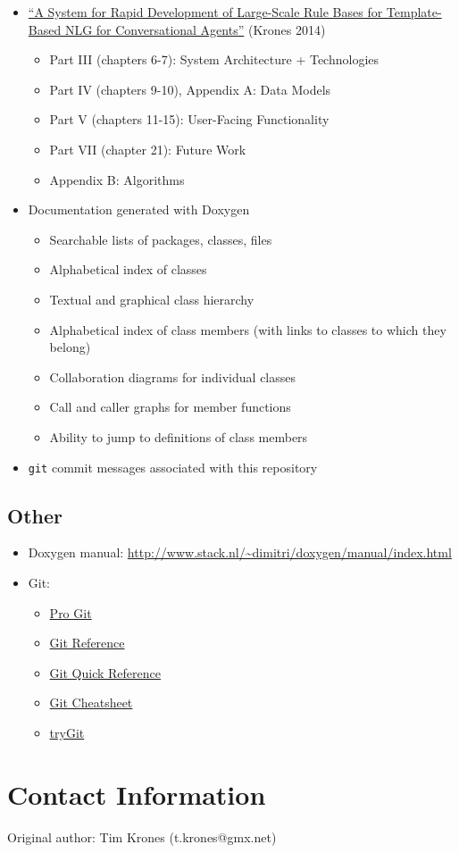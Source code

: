 \documentclass[11pt]{article}
\begin{document}
\begin{itemize}
\item \href{thesis-krones.pdf}{``A System for Rapid Development of Large-Scale Rule Bases for Template-Based NLG for Conversational Agents''} (Krones 2014)
\begin{itemize}
\item Part III (chapters 6-7): System Architecture + Technologies
\item Part IV (chapters 9-10), Appendix A: Data Models
\item Part V (chapters 11-15): User-Facing Functionality
\item Part VII (chapter 21): Future Work
\item Appendix B: Algorithms
\end{itemize}
\item Documentation generated with Doxygen
\begin{itemize}
\item Searchable lists of packages, classes, files
\item Alphabetical index of classes
\item Textual and graphical class hierarchy
\item Alphabetical index of class members (with links to classes to
which they belong)
\item Collaboration diagrams for individual classes
\item Call and caller graphs for member functions
\item Ability to jump to definitions of class members
\end{itemize}
\item \texttt{git} commit messages associated with this repository
\end{itemize}

\subsection{Other}
\label{sec-4-5}
\begin{itemize}
\item Doxygen manual:
\url{http://www.stack.nl/~dimitri/doxygen/manual/index.html}
\item Git:
\begin{itemize}
\item \href{http://git-scm.com/book}{Pro Git}
\item \href{http://gitref.org/}{Git Reference}
\item \href{http://jonas.nitro.dk/git/quick-reference.html}{Git Quick Reference}
\item \href{http://www.ndpsoftware.com/git-cheatsheet.html}{Git Cheatsheet}
\item \href{https://www.codeschool.com/courses/try-git}{tryGit}
\end{itemize}
\end{itemize}

\section{Contact Information}
\label{sec-5}
Original author: Tim Krones (t.krones@gmx.net)
\end{document}
